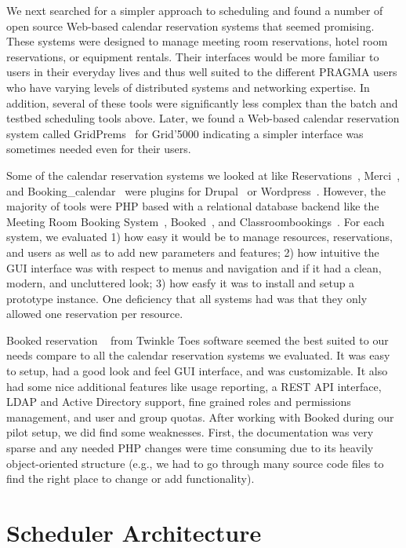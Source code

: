 \documentclass{acm_proc_article-sp}
\begin{document}
We next searched for a simpler approach to scheduling and found a number of open source Web-based calendar reservation systems that seemed promising.  These systems were designed to manage meeting room reservations, hotel room reservations, or equipment rentals.   Their interfaces would be more familiar to users in their everyday lives and thus well suited to the different PRAGMA users who have varying levels of distributed systems and networking expertise.  In addition, several of these tools were significantly less complex than the batch and testbed scheduling tools above.  Later, we found a Web-based calendar reservation system called GridPrems~\cite{gridprems} for Grid'5000 indicating a simpler interface was sometimes needed even for their users.

Some of the calendar reservation systems we looked at like Reservations~\cite{drupalreservations}, Merci~\cite{merci}, and Booking\_calendar~\cite{wordpressbooking} were plugins for Drupal~\cite{drupal} or Wordpress~\cite{wordpress}.  However, the majority of tools were PHP based with a relational database backend like the Meeting Room Booking System~\cite{mrbs}, Booked~\cite{booked}, and Classroombookings~\cite{classroombookings}.  For each system, we evaluated 1) how easy it would be to manage resources, reservations, and users as well as to add new parameters and features; 2) how intuitive the GUI interface was with respect to menus and navigation and if it had a clean, modern, and uncluttered look; 3)  how easfy it was to install and setup a prototype instance. One deficiency that all systems had was that they only allowed one reservation per resource.

Booked reservation ~\cite{booked} from Twinkle Toes software seemed the best suited to our needs compare to all the calendar reservation systems we evaluated.  It was easy to setup, had  a good look and feel GUI interface, and was customizable.  It also had some nice additional features like usage reporting, a REST API interface, LDAP and Active Directory support, fine grained roles and permissions management, and user and group quotas.  After working with Booked during our pilot setup, we did find some weaknesses.  First, the documentation was very sparse and any needed PHP changes were time consuming due to its heavily object-oriented structure (e.g., we had to go through many source code files to find the right place to change  or add functionality). 


\section{Scheduler Architecture}
\label{Sec:Arch}
\end{document}
